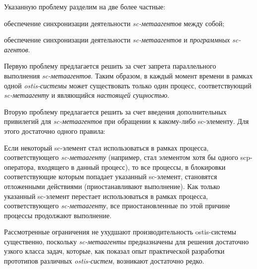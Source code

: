 \begin{SCn}
{Указанную проблему разделим на две более частные:
\begin{scnitemize}
	\item обеспечение синхронизации деятельности \textit{sc-метаагентов} между собой;
	\item обеспечение синхронизации деятельности \textit{sc-метаагентов} и \textit{программных sc-агентов}.		
\end{scnitemize}
	
Первую проблему предлагается решить за счет запрета параллельного выполнения \textit{sc-метаагентов}. Таким образом, в каждый момент времени в рамках одной \textit{ostis-системы} может существовать только один процесс, соответствующий \textit{sc-метаагенту} и являющийся \textit{настоящей сущностью}. 
	
Вторую проблему предлагается решить за счет введения дополнительных привилегий для \textit{sc-метаагентов} при обращении к какому-либо sc-элементу. Для этого достаточно одного правила: 

Если некоторый sc-элемент стал использоваться в рамках процесса, соответствующего \textit{sc-метаагенту} (например, стал элементом хотя бы одного scp-оператора, входящего в данный процесс), то все процессы, в блокировки соответствующие которым попадает указанный sc-элемент, становятся отложенными действиями (приостанавливают выполнение). Как только указанный sc-элемент перестает использоваться в рамках процесса, соответствующего \textit{sc-метаагенту}, все приостановленные по этой причине процессы продолжают выполнение.
	
Рассмотренные ограничения не ухудшают производительность ostis-системы существенно, поскольку \textit{sc-метаагенты} предназначены для решения достаточно узкого класса задач, которые, как показал опыт практической разработки прототипов различных \textit{ostis-систем}, возникают достаточно редко.}

\bigskip
\scnendstruct {}

\bigskip
\scnendstruct \scnendcurrentsectioncomment

\end{SCn}
